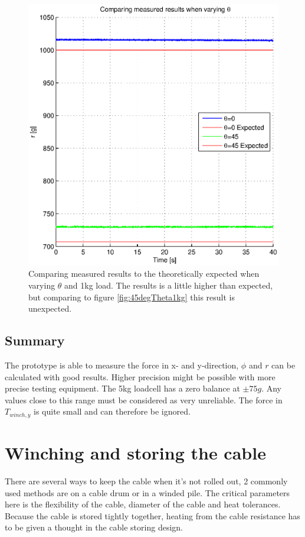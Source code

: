 \begin{figure}[H]
\centering
\includegraphics[scale=1]{graphics/gcs_test/Theta1kgCable.eps}
\caption{Comparing measured results to the theoretically expected when varying $\theta$ and 1kg load. The results is a little higher than expected, but comparing to figure \ref{fig:45degTheta1kg} this result is unexpected.}
\end{figure}




\subsection{Summary}
The prototype is able to measure the force in x- and y-direction, $\phi$ and $r$ can be calculated with good results. Higher precision might be possible with more precise testing equipment.
The 5kg loadcell has a zero balance at $\pm75g$. Any values close to this range must be considered as very unreliable. 
The force in $T_{winch,y}$ is quite small and can therefore be ignored.




\section{Winching and storing the cable}
There are several ways to keep the cable when it's not rolled out, 2 commonly used methods are on a cable drum or in a winded pile. The critical parameters here is the flexibility of the cable, diameter of the cable and heat tolerances.  Because the cable is stored tightly together, heating from the cable resistance has to be given a thought in the cable storing design.

